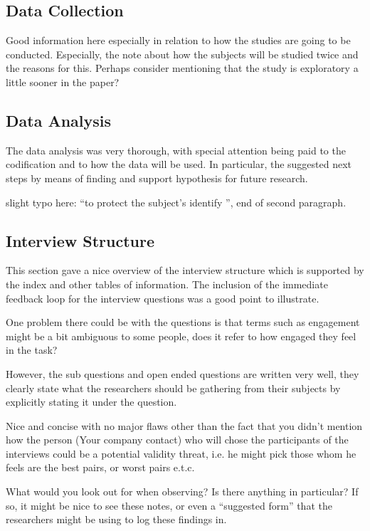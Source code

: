 \documentclass[times, 10pt,twocolumn]{IEEEtran}
\begin{document}
\subsection*{Data Collection}
Good information here especially in relation to how the studies are going to be conducted. Especially, the note about how the subjects will be studied twice and the reasons for this. Perhaps consider mentioning that the study is exploratory a little sooner in the paper?

\subsection*{Data Analysis}
The data analysis was very thorough, with special attention being paid to the codification and to how the data will be used. In particular, the suggested next steps by means of finding and support hypothesis for future research.

slight typo here: ``to protect the subject’s identify '', end of second paragraph.

\subsection*{Interview Structure}
This section gave a nice overview of the interview structure which is supported by the index and other tables of information. The inclusion of the immediate feedback loop for the interview questions was a good point to illustrate.

One problem there could be with the questions is that terms such as engagement might be a bit ambiguous to some people, does it refer to how engaged they feel in the task? 

However, the sub questions and open ended questions are written very well, they clearly state what the researchers should be gathering from their subjects by explicitly stating it under the question.

Nice and concise with no major flaws other than the fact that you didn't mention how the person (Your company contact) who will chose the participants of the interviews could be a potential validity threat, i.e. he might pick those whom he feels are the best pairs, or worst pairs e.t.c.

What would you look out for when observing? Is there anything in particular? If so, it might be nice to see these notes, or even a ``suggested form'' that the researchers might be using to log these findings in.
\end{document}
